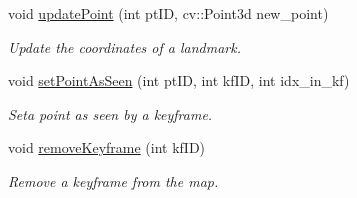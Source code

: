 \begin{DoxyCompactItemize}
void \hyperlink{classMap_a4338fe122941088dc90ed54dfb8e286d}{update\+Point} (int pt\+ID, cv\+::\+Point3d new\+\_\+point)
\begin{DoxyCompactList}\small\item\em Update the coordinates of a landmark. \end{DoxyCompactList}\item 
void \hyperlink{classMap_a1e548f20958c5719c79ca45ed8a8893a}{set\+Point\+As\+Seen} (int pt\+ID, int kf\+ID, int idx\+\_\+in\+\_\+kf)
\begin{DoxyCompactList}\small\item\em Seta point as seen by a keyframe. \end{DoxyCompactList}\item 
\mbox{\label{classMap_a0a4ccf9ee6358552dda552b76ab2619c}} 
void \hyperlink{classMap_a0a4ccf9ee6358552dda552b76ab2619c}{remove\+Keyframe} (int kf\+ID)
\begin{DoxyCompactList}\small\item\em Remove a keyframe from the map. \end{DoxyCompactList}\end{DoxyCompactItemize}
